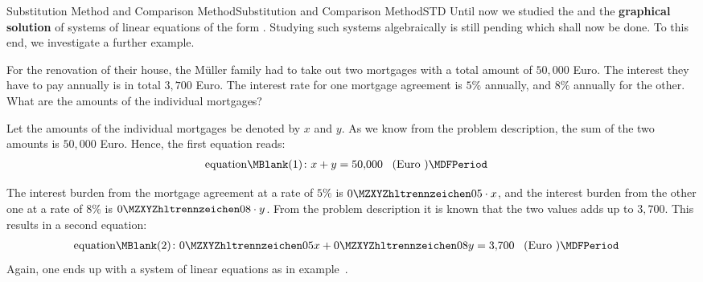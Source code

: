 \begin{MXContent}{Substitution Method and Comparison Method}{Substitution and Comparison Method}{STD}
Until now we studied the  and the \textbf{graphical solution}
of systems of linear equations of the form .
Studying such systems algebraically is still pending which shall now be done.
To this end, we investigate a further example.

\begin{MExample}
For the renovation of their house, the Müller family had to take out two mortgages with a total amount of
 $50{,}000$ Euro. The interest they have to pay annually is in total  $3{,}700$ Euro. The interest rate for 
one mortgage agreement is $5\%$ annually, and  $8\%$ annually for the other. What are the
amounts of the individual mortgages?

Let the amounts of the individual mortgages be denoted by $x$ and $y$. As we know from the 
problem description, the sum of the two amounts is $50{,}000$ Euro. Hence, the first 
equation reads:
\begin{eqnarray*}
\mbox{equation}\MBlank (1) & \colon x + y = 50{,}000 \; \; \; \mbox{(Euro )}\MDFPeriod 
\end{eqnarray*}

The interest burden from the mortgage agreement at a rate of $5\%$ is $\MZahl{0}{05} \cdot x$, 
and the interest burden from the other one at a rate of $8\%$ is $\MZahl{0}{08} \cdot y$. From
the problem description it is known that the two values adds up to $3{,}700$. This results in
a second equation:
\begin{eqnarray*}
\mbox{equation}\MBlank (2) & \colon \MZahl{0}{05} x + \MZahl{0}{08} y = 3{,}700 \; \; \; \mbox{(Euro )}\MDFPeriod 
\end{eqnarray*}
Again, one ends up with a system of linear equations as in example~.


\end{MExample}
\end{MXContent}
